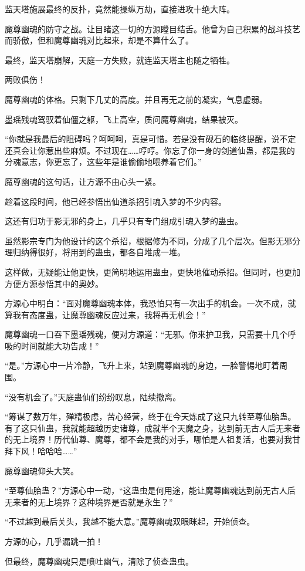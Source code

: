 \begin{this_body}
监天塔施展最终的反扑，竟然能操纵万劫，直接进攻十绝大阵。

魔尊幽魂的防守之战。让目睹这一切的方源瞠目结舌。他曾为自己积累的战斗技艺而骄傲，但和魔尊幽魂对比起来，却是不算什么了。

最终，监天塔崩解，天庭一方失败，就连监天塔主也随之牺牲。

两败俱伤！

魔尊幽魂的体格。只剩下几丈的高度。并且再无之前的凝实，气息虚弱。

墨瑶残魂驾驭着仙僵之躯，飞上高空，质问魔尊幽魂，结果被灭。

“你就是我最后的阻碍吗？呵呵呵，真是可惜。若是没有砚石的临终提醒，说不定还真会让你惹出些麻烦。不过现在……哼哼。你忘了你一身的剑道仙蛊，都是我的分魂意志，你更忘了，这些年是谁偷偷地喂养着它们。”

魔尊幽魂的这句话，让方源不由心头一紧。

趁着这段时间，他已经参悟出仙道杀招引魂入梦的不少内容。

这还有归功于影无邪的身上，几乎只有专门组成引魂入梦的蛊虫。

虽然影宗专门为他设计的这个杀招，根据修为不同，分成了几个层次。但影无邪分理归纳得很好，将用到的蛊虫，都各自堆成一堆。

这样做，无疑能让他更快，更简明地运用蛊虫，更快地催动杀招。但同时，也更加方便方源参悟其中的奥妙。

方源心中明白：“面对魔尊幽魂本体，我恐怕只有一次出手的机会。一次不成，就算我有态度蛊，让魔尊幽魂反应过来，我将再无机会！”

魔尊幽魂一口吞下墨瑶残魂，便对方源道：“无邪。你来护卫我，只需要十几个呼吸的时间就能大功告成！”

“是。”方源心中一片冷静，飞升上来，站到魔尊幽魂的身边，一脸警惕地盯着周围。

“没有机会了。”天庭蛊仙们纷纷叹息，陆续撤离。

“筹谋了数万年，殚精极虑，苦心经营，终于在今天炼成了这只九转至尊仙胎蛊。有了这只仙蛊，我就能超越历史诸尊，成就半个天魔之身，达到前无古人后无来者的无上境界！历代仙尊、魔尊，都不会是我的对手，哪怕是人祖复活，也要对我甘拜下风！哈哈哈……”

魔尊幽魂仰头大笑。

“至尊仙胎蛊？”方源心中一动，“这蛊虫是何用途，能让魔尊幽魂达到前无古人后无来者的无上境界？这种境界是否就是永生？”

“不过越到最后关头，我越不能大意。”魔尊幽魂双眼眯起，开始侦查。

方源的心，几乎漏跳一拍！

但最终，魔尊幽魂只是喷吐幽气，清除了侦查蛊虫。


\end{this_body}
